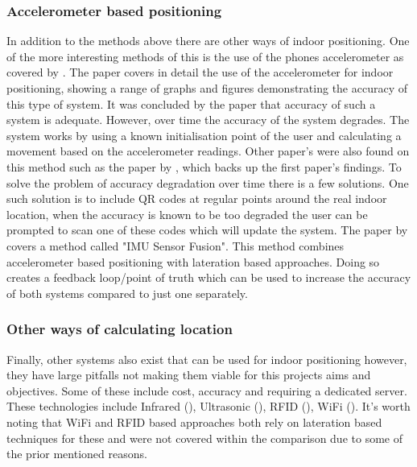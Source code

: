 \subsubsection{Accelerometer based positioning}
In addition to the methods above there are other ways of indoor positioning. One of the more interesting methods of this is the use of the phones accelerometer as covered by \cite{nagpalparamvirsingh_2013_indoor}. The paper covers in detail the use of the accelerometer for indoor positioning, showing a range of graphs and figures demonstrating the accuracy of this type of system. It was concluded by the paper that accuracy of such a system is adequate. However, over time the accuracy of the system degrades. The system works by using a known initialisation point of the user and calculating a movement based on the accelerometer readings. Other paper's were also found on this method such as the paper by \cite{palma_2017_evolution}, which backs up the first paper's findings. To solve the problem of accuracy degradation over time there is a few solutions. One such solution is to include QR codes at regular points around the real indoor location, when the accuracy is known to be too degraded the user can be prompted to scan one of these codes which will update the system. The paper by \cite{comer_uwb_vs_ble} covers a method called "IMU Sensor Fusion". This method combines accelerometer based positioning with lateration based approaches. Doing so creates a feedback loop/point of truth which can be used to increase the accuracy of both systems compared to just one separately.

\subsubsection{Other ways of calculating location}
Finally, other systems also exist that can be used for indoor positioning however, they have large pitfalls not making them viable for this projects aims and objectives. Some of these include cost, accuracy and requiring a dedicated server. These technologies include Infrared (\cite{palma_2017_evolution}), Ultrasonic (\cite{qi_2017_a}), RFID (\cite{kim_2013_rfidbased}), WiFi (\cite{duyuanfeng_2016_flexible}). It's worth noting that WiFi and RFID based approaches both rely on lateration based techniques for these and were not covered within the comparison due to some of the prior mentioned reasons.
